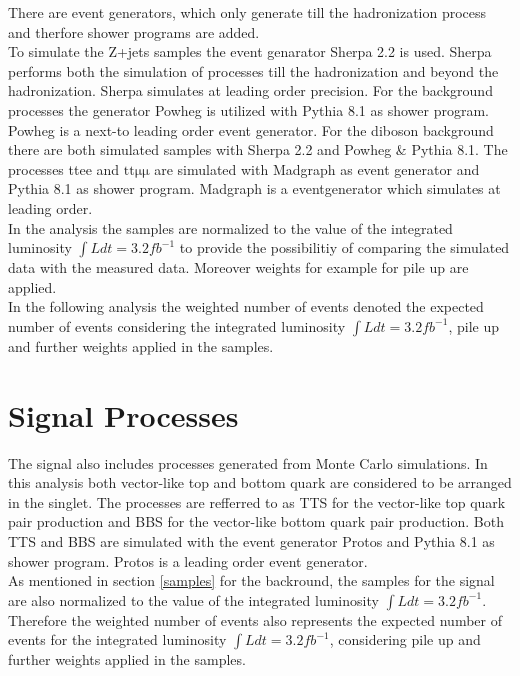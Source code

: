 There are event generators, which only generate till the hadronization process and therfore shower programs are added.\\
To simulate the Z+jets samples the event genarator Sherpa 2.2 is used.
Sherpa \cite{Sherpa} performs both the simulation of processes till the hadronization and beyond the hadronization.
Sherpa simulates at leading order precision. 
For the \ttbar{} background processes the generator Powheg is utilized with Pythia 8.1 \cite{Pythia} as shower program.
Powheg \cite{Powheg} is a next-to leading order event generator.
For the diboson background there are both simulated samples with Sherpa 2.2 and Powheg \& Pythia 8.1.
The processes ttee and $\mathrm{tt \mu \mu}$ are simulated with Madgraph as event generator and Pythia 8.1 as shower program.
Madgraph \cite{Madgraph} is a eventgenerator which simulates at leading order.\\
In the analysis the samples are normalized to the value of the integrated luminosity $\int{L} dt = 3.2 fb^{-1}$ to provide the possibilitiy of comparing the simulated data with the measured data.
Moreover weights for example for pile up are applied.\\
In the following analysis the weighted number of events denoted the expected number of events considering the integrated luminosity $\int{L} dt = 3.2 fb^{-1}$, pile up and further weights applied in the samples.


\section{Signal Processes}
The signal also includes processes generated from Monte Carlo simulations. 
In this analysis both vector-like top and bottom quark are considered to be arranged in the singlet.
The processes are refferred to as TTS for the vector-like top quark pair production and BBS for the vector-like bottom quark pair production.
Both TTS and BBS are simulated with the event generator Protos and Pythia 8.1 as shower program.
Protos \cite{Protos} is a leading order event generator.\\
As mentioned in section \ref{samples} for the backround, the samples for the signal are also normalized to the value of the integrated luminosity $\int{L} dt = 3.2 fb^{-1}$.
Therefore the weighted number of events also represents the expected number of events for the integrated luminosity $\int{L} dt = 3.2 fb^{-1}$, considering pile up and further weights applied in the samples.
